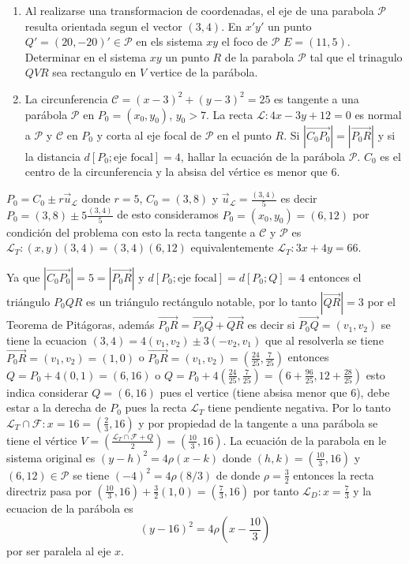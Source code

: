 \documentclass[12pt,]{report}
\theoremstyle{definition}
\theoremstyle{definition}
\theoremstyle{definition}
\theoremstyle{remark}
\begin{document}
\begin{enumerate}
\def\labelenumi{\arabic{enumi}.}
\item
  Al realizarse una transformacion de coordenadas, el eje de una parabola \(\mathcal{P}\) resulta orientada segun el vector \((3,4)\). En \(x'y'\) un punto \(Q'=(20,-20)'\in\mathcal{P}\) en els sistema \(xy\) el foco de \(\mathcal{P}\) \(E=(11,5)\). Determinar en el sistema \(xy\) un punto \(R\) de la parabola \(\mathcal{P}\) tal que el trinagulo \(QVR\) sea rectangulo en \(V\) vertice de la parábola.
\item
  La circunferencia \(\mathcal{C}=(x-3)^2+(y-3)^2=25\) es tangente a una parábola \(\mathcal{P}\) en \(P_0=(x_0,y_0)\), \(y_0>7\). La recta \(\mathcal{L}:4x-3y+12=0\) es normal a \(\mathcal{P}\) y \(\mathcal{C}\) en \(P_0\) y corta al eje focal de \(\mathcal{P}\) en el punto \(R\). Si \(\left|\vec{C_0P_0}\right|=\left|\vec{P_0R}\right|\) y si la distancia \(d[P_0; \text{eje focal}]=4\), hallar la ecuación de la parábola \(\mathcal{P}\). \(C_0\) es el centro de la circunferencia y la absisa del vértice es menor que 6.
\end{enumerate}

\(P_0=C_0\pm r\vec{u}_{\mathcal{L}}\) donde \(r=5\), \(C_0=(3,8)\) y \(\vec{u}_{\mathcal{L}}=\frac{(3,4)}{5}\) es decir \(P_0=(3,8)\pm 5\frac{(3,4)}{5}\) de esto consideramos \(P_0=(x_0,y_0)=(6,12)\) por condición del problema con esto la recta tangente a \(\mathcal{C}\) y \(\mathcal{P}\) es \(\mathcal{L}_T:(x,y)(3,4)=(3,4)(6,12)\) equivalentemente \(\mathcal{L}_T:3x+4y=66\).

Ya que \(\left|\vec{C_0P_0}\right|=5=\left|\vec{P_0R}\right|\) y \(d[P_0;\text{eje focal}]=d[P_0; Q]=4\) entonces el triángulo \(P_0QR\) es un triángulo rectángulo notable, por lo tanto \(\left|\vec{QR}\right|=3\) por el Teorema de Pitágoras, además \(\vec{P_0R}=\vec{P_0Q}+\vec{QR}\) es decir si \(\vec{P_0Q}=(v_1,v_2)\) se tiene la ecuacion \((3,4)=4(v_1,v_2)\pm 3(-v_2,v_1)\) que al resolverla se tiene \(\vec{P_0R}=(v_1,v_2)=(1,0)\) o \(\vec{P_0R}=(v_1,v_2)=\left(\frac{24}{25},\frac{7}{25}\right)\) entonces \(Q=P_0+4(0,1)=(6,16)\) o \(Q=P_0+4\left(\frac{24}{25},\frac{7}{25}\right)=\left(6+\frac{96}{25},12+\frac{28}{25}\right)\) esto indica considerar \(Q=(6,16)\) pues el vertice (tiene absisa menor que 6), debe estar a la derecha de \(P_0\) pues la recta \(\mathcal{L}_T\) tiene pendiente negativa. Por lo tanto \(\mathcal{L}_T\cap \mathcal{F}:x=16=(\frac{2}{3},16)\) y por propiedad de la tangente a una parábola se tiene el vértice \(V=\left(\frac{\mathcal{L}_T\cap \mathcal{F}+Q}{2}\right)=\left(\frac{10}{3}, 16\right)\). La ecuación de la parabola en le sistema original es \((y-h)^2=4\rho(x-k)\) donde \((h,k)=\left(\frac{10}{3}, 16\right)\) y \((6,12)\in\mathcal{P}\) se tiene \((-4)^2=4\rho(8/3)\) de donde \(\rho=\frac{3}{2}\) entonces la recta directriz pasa por \(\left(\frac{10}{3}, 16\right)+\frac{3}{2}(1,0)=\left(\frac{7}{3}, 16\right)\) por tanto \(\mathcal{L}_D:x=\frac{7}{3}\) y la ecuacion de la parábola es \[(y-16)^2=4\rho\left(x-\frac{10}{3}\right)\] por ser paralela al eje \(x.\)
\end{document}
